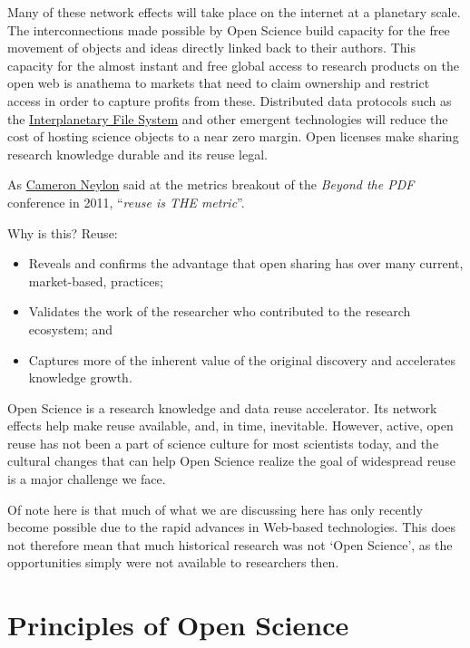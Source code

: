 \documentclass[]{book}
\begin{document}
{{{Many of these network effects will take place on the internet at a planetary scale. The interconnections made possible by Open Science build capacity for the free movement of objects and ideas directly linked back to their authors. This capacity for the almost instant and free global access to research products on the open web is anathema to markets that need to claim ownership and restrict access in order to capture profits from these. Distributed data protocols such as the \href{https://ipfs.io/}{Interplanetary File System} and other emergent technologies will reduce the cost of hosting science objects to a near zero margin. Open licenses make sharing research knowledge durable and its reuse legal.

As \href{https://en.wikipedia.org/wiki/Cameron_Neylon}{Cameron Neylon} said at the metrics breakout of the \emph{Beyond the PDF} conference in 2011, ``\emph{reuse is THE metric}''.

Why is this? Reuse:

\begin{itemize}
\item
  Reveals and confirms the advantage that open sharing has over many current, market-based, practices;
\item
  Validates the work of the researcher who contributed to the research ecosystem; and
\item
  Captures more of the inherent value of the original discovery and accelerates knowledge growth.
\end{itemize}

Open Science is a research knowledge and data reuse accelerator. Its network effects help make reuse available, and, in time, inevitable. However, active, open reuse has not been a part of science culture for most scientists today, and the cultural changes that can help Open Science realize the goal of widespread reuse is a major challenge we face.

Of note here is that much of what we are discussing here has only recently become possible due to the rapid advances in Web-based technologies. This does not therefore mean that much historical research was not `Open Science', as the opportunities simply were not available to researchers then.

\hypertarget{principles-of-open-science}{%
\section{Principles of Open Science }\label{principles-of-open-science}}

}}}
\end{document}
